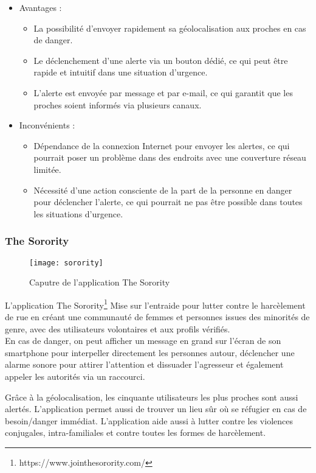 \begin{itemize}
	\item Avantages :
	\begin{itemize}
		\item La possibilité d'envoyer rapidement sa géolocalisation aux proches en cas de danger.
		\item Le déclenchement d'une alerte via un bouton dédié, ce qui peut être rapide et intuitif dans une situation d'urgence.
		\item L'alerte est envoyée par message et par e-mail, ce qui garantit que les proches soient informés via plusieurs canaux.
	\end{itemize}
	
	\item Inconvénients :
	\begin{itemize}
		\item Dépendance de la connexion Internet pour envoyer les alertes, ce qui pourrait poser un problème dans des endroits avec une couverture réseau limitée.
		
		\item Nécessité d'une action consciente de la part de la personne en danger pour déclencher l'alerte, ce qui pourrait ne pas être possible dans toutes les situations d'urgence.
	\end{itemize}
	
\end{itemize}

\subsubsection{The Sorority}
\begin{figure}[H]
	\centering
	\texttt{[image: sorority]}
	\caption{Caputre de l’application The Sorority}
\end{figure}

L’application The Sorority\footnote{https://www.jointhesorority.com/} Mise sur l’entraide pour lutter contre le harcèlement de rue en créant une communauté de femmes et personnes issues des minorités de genre, avec des utilisateurs volontaires et aux profils vérifiés.\\ 

En cas de danger, on peut afficher un message en grand sur l’écran de son smartphone pour interpeller directement les personnes autour, déclencher une alarme sonore pour attirer l’attention et dissuader l’agresseur et également appeler les autorités via un raccourci.

Grâce à la géolocalisation, les cinquante utilisateurs les plus proches sont aussi alertés. L’application permet aussi de trouver un lieu sûr où se réfugier en cas de besoin/danger immédiat. L’application aide aussi à lutter contre les violences conjugales, intra-familiales et contre toutes les formes de harcèlement.

